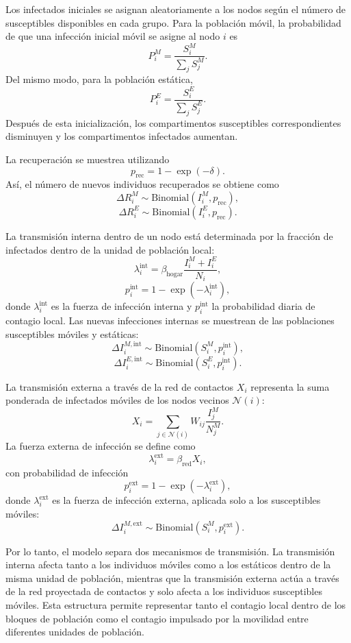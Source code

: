 \documentclass[12pt,a4paper,twocolumn]{article}
\begin{document}
Los infectados iniciales se asignan aleatoriamente a los nodos según el número de susceptibles disponibles en cada grupo. Para la población móvil, la probabilidad de que una infección inicial móvil se asigne al nodo \(i\) es
\[
P_i^M=\frac{S_i^M}{\sum_j S_j^M}.
\]
Del mismo modo, para la población estática,
\[
P_i^E=\frac{S_i^E}{\sum_j S_j^E}.
\]
Después de esta inicialización, los compartimentos susceptibles correspondientes disminuyen y los compartimentos infectados aumentan.

La recuperación se muestrea utilizando
\[
p_{\mathrm{rec}}=1-\exp(-\delta).
\]
Así, el número de nuevos individuos recuperados se obtiene como
\[
\Delta R_i^M \sim \mathrm{Binomial}(I_i^M,p_{\mathrm{rec}}),
\]
\[
\Delta R_i^E \sim \mathrm{Binomial}(I_i^E,p_{\mathrm{rec}}).
\]

La transmisión interna dentro de un nodo está determinada por la fracción de infectados dentro de la unidad de población local:
\[
\lambda_i^{\mathrm{int}}
=
\beta_{\mathrm{hogar}}
\frac{I_i^M+I_i^E}{N_i},
\]
\[
p_i^{\mathrm{int}}=1-\exp(-\lambda_i^{\mathrm{int}}),
\]
donde $\lambda_i^{\mathrm{int}}$ es la fuerza de infección interna y $p_i^{\mathrm{int}}$ la probabilidad diaria de contagio local.
Las nuevas infecciones internas se muestrean de las poblaciones susceptibles móviles y estáticas:
\[
\Delta I_i^{M,\mathrm{int}} \sim \mathrm{Binomial}(S_i^M,p_i^{\mathrm{int}}),
\]
\[
\Delta I_i^{E,\mathrm{int}} \sim \mathrm{Binomial}(S_i^E,p_i^{\mathrm{int}}).
\]

La transmisión externa a través de la red de contactos $X_i$ representa la suma ponderada de infectados móviles de los nodos vecinos $\mathcal{N}(i)$:
\[
X_i=\sum_{j\in \mathcal{N}(i)}W_{ij}\frac{I_j^M}{N_j^M}.
\]
La fuerza externa de infección se define como
\[
\lambda_i^{\mathrm{ext}}=\beta_{\mathrm{red}}X_i,
\]
con probabilidad de infección
\[
p_i^{\mathrm{ext}}=1-\exp(-\lambda_i^{\mathrm{ext}}),
\]
donde $\lambda_i^{\mathrm{ext}}$ es la fuerza de infección externa, aplicada solo a los susceptibles móviles:
\[
\Delta I_i^{M,\mathrm{ext}} \sim \mathrm{Binomial}(S_i^M,p_i^{\mathrm{ext}}).
\]

Por lo tanto, el modelo separa dos mecanismos de transmisión. La transmisión interna afecta tanto a los individuos móviles como a los estáticos dentro de la misma unidad de población, mientras que la transmisión externa actúa a través de la red proyectada de contactos y solo afecta a los individuos susceptibles móviles. Esta estructura permite representar tanto el contagio local dentro de los bloques de población como el contagio impulsado por la movilidad entre diferentes unidades de población.
\end{document}
